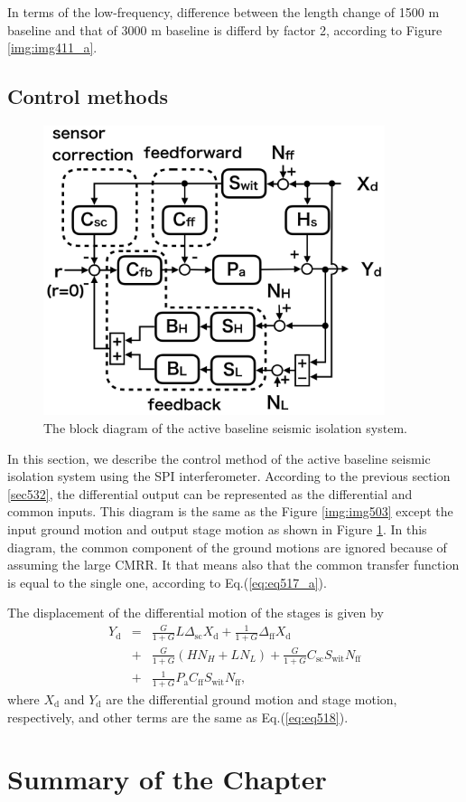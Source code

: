 In terms of the low-frequency, difference between the length change of 1500 m baseline and that of 3000 m baseline is differd by factor 2, according to Figure \ref{img:img411_a}.

\subsection{Control methods} \label{sec:444}
\begin{figure}[h]
  \begin{center}   
    \includegraphics[width=10cm]{./img_chap5/img511.png}
    \caption{The block diagram of the active baseline seismic isolation system.} \label{img:img511}
  \end{center}
\end{figure}

In this section, we describe the control method of the active baseline seismic isolation system using the SPI interferometer. According to the previous section \cref{sec532}, the differential output can be represented as the differential and common inputs. This diagram is the same as the Figure \ref{img:img503} except the input ground motion and output stage motion as shown in Figure \ref{img:img511}. In this diagram, the common component of the ground motions are ignored because of assuming the large CMRR. It that means also that the common transfer function is equal to the single one, according to Eq.(\ref{eq:eq517_a}).

The displacement of the differential motion of the stages is given by 
\begin{eqnarray}\nonumber
  Y_{\mathrm{d}} &=&\frac{G}{1+G}L\Delta_{\mathrm{sc}} X_{\mathrm{d}} + \frac{1}{1+G} \Delta_{\mathrm{ff}} X_{\mathrm{d}}\\ \nonumber
  &+& \frac{G}{1+G}\left(HN_{H}+LN_{L}\right) + \frac{G}{1+G}C_{\mathrm{sc}}S_{\mathrm{wit}}N_{\mathrm{ff}} \\ 
  &+& \frac{1}{1+G}P_{\mathrm{a}} C_{\mathrm{ff}}S_{\mathrm{wit}}N_{\mathrm{ff}} \label{eq:eq520},
\end{eqnarray}
where $X_{\mathrm{d}}$ and $Y_{\mathrm{d}}$ are the differential ground motion and stage motion, respectively, and other terms are the same as Eq.(\ref{eq:eq518}).




\section{Summary of the Chapter}
